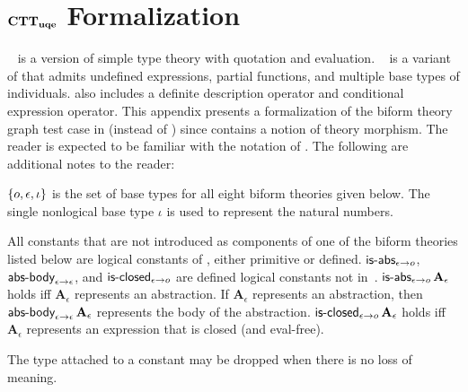 \section{${\bf CTT}_{\bf uqe}$ Formalization}\label{app:cttuqe}

\setcounter{biformthy}{0}

{\churchqe}~\cite{FarmerArxiv16} is a version of simple type theory
with quotation and evaluation.  {\churchuqe}~\cite{FarmerArxiv17} is a
variant of {\churchqe} that admits undefined expressions, partial
functions, and multiple base types of individuals.  {\churchuqe} also
includes a definite description operator and conditional expression
operator.  This appendix presents a formalization of the biform theory
graph test case in {\churchuqe} (instead of {\churchqe}) since
{\churchuqe} contains a notion of theory morphism.  The reader is
expected to be familiar with the notation of {\churchuqe}.  The
following are additional notes to the reader:

\be

  \item ${\{ o,\epsilon,\iota \}}$ is the set of base types for all
    eight biform theories given below.  The single nonlogical base
    type $\iota$ is used to represent the natural numbers.

  \item All constants that are not introduced as components of one of
    the biform theories listed below are logical constants of
    {\churchuqe}, either primitive or defined.
    $\mbox{\sf is-abs}_{\epsilon \rightarrow o}$, $\mbox{\sf abs-body}_{\epsilon
      \rightarrow \epsilon}$, and $\mbox{\sf is-closed}_{\epsilon \rightarrow o}$
    are defined logical constants not in~\cite{FarmerArxiv16}.
    $\mbox{\sf is-abs}_{\epsilon \rightarrow o} \, \textbf{A}_\epsilon$ holds
    iff $\textbf{A}_\epsilon$ represents an abstraction.  If
    $\textbf{A}_\epsilon$ represents an abstraction, then
    $\mbox{\sf abs-body}_{\epsilon \rightarrow \epsilon} \,
    \textbf{A}_\epsilon$ represents the body of the abstraction.
    $\mbox{\sf is-closed}_{\epsilon \rightarrow o} \, \textbf{A}_\epsilon$
    holds iff $\textbf{A}_\epsilon$ represents an expression that is
    closed (and eval-free).

  \item The type attached to a constant may be dropped when there is
    no loss of meaning.

\iffalse
  \item When it makes sense, the notation
    $\set{\textbf{A}_{\alpha}^{1}, \ldots, \textbf{A}_{\alpha}^{n}}$
    denotes the predicate
    \[\LambdaApp \textbf{x}_\alpha \mdot 
    (\textbf{x}_\alpha = \textbf{A}_{\alpha}^{1} \OR \cdots \OR
    \textbf{x}_\alpha = \textbf{A}_{\alpha}^{n}).\]
\fi

